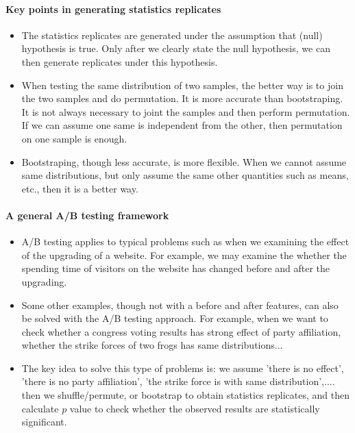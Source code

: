\documentclass[11pt]{article}
\begin{document}
    \paragraph{Key points in generating statistics
replicates}\label{key-points-in-generating-statistics-replicates}

\begin{itemize}
\item
  The statistics replicates are generated under the assumption that
  (null) hypothesis is true. Only after we clearly state the null
  hypothesis, we can then generate replicates under this hypothesis.
\item
  When testing the same distribution of two samples, the better way is
  to join the two samples and do permutation. It is more accurate than
  bootstraping. It is not always necessary to joint the samples and then
  perform permutation. If we can assume one same is independent from the
  other, then permutation on one sample is enough.
\item
  Bootstraping, though less accurate, is more flexible. When we cannot
  assume same distributions, but only assume the same other quantities
  such as means, etc., then it is a better way.
\end{itemize}

    \paragraph{A general A/B testing
framework}\label{a-general-ab-testing-framework}

\begin{itemize}
\item
  A/B testing applies to typical problems such as when we examining the
  effect of the upgrading of a website. For example, we may examine the
  whether the spending time of visitors on the website has changed
  before and after the upgrading.
\item
  Some other examples, though not with a before and after features, can
  also be solved with the A/B testing approach. For example, when we
  want to check whether a congress voting results has strong effect of
  party affiliation, whether the strike forces of two frogs has same
  distributions...
\item
  The key idea to solve this type of problems is: we assume 'there is no
  effect', 'there is no party affiliation', 'the strike force is with
  same distribution',.... then we shuffle/permute, or bootstrap to
  obtain statistics replicates, and then calculate \(p\) value to check
  whether the observed results are statistically significant.
\end{itemize}
\end{document}
